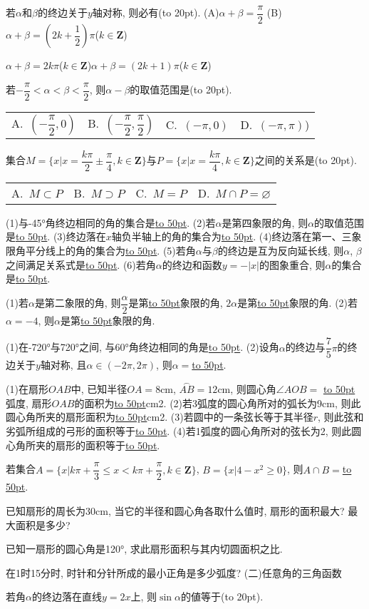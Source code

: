\documentclass[10pt,a4paper]{article}
\newcommand{\blank}[1]{\underline{\hbox to #1pt{}}}
\newcommand{\bracket}[1]{(\hbox to #1pt{})}
\newcommand{\fourch}[4]{\par\begin{tabular}{p{.23\textwidth}p{.23\textwidth}p{.23\textwidth}p{.23\textwidth}}
A.~#1 &B.~#2& C.~#3& D.~#4
\end{tabular}}
\begin{document}
\begin{enumerate}[1.]
{\item 若$\alpha$和$\beta$的终边关于$y$轴对称, 则必有\bracket{20}.
(A)$\alpha +\beta =\dfrac{\pi }2$						(B)$\alpha +\beta =(2k+\dfrac 12)\pi$($k\in \mathbf{Z}$)}{$\alpha +\beta =2k\pi$($k\in \mathbf{Z}$)}{$\alpha +\beta =(2k+1)\pi$($k\in \mathbf{Z}$)}
\item 若$-\dfrac{\pi }2<\alpha <\beta <\dfrac{\pi }2$, 则$\alpha -\beta$的取值范围是\bracket{20}.
\fourch{$(-\dfrac{\pi }2,0)$}{$(-\dfrac{\pi }2,\dfrac{\pi }2)$}{$(-\pi ,0)$}{$(-\pi ,\pi)$)}
\item 集合$M=\{x|x=\dfrac{k\pi }2\pm \dfrac{\pi }4,k\in \mathbf{Z}\}$与$P=\{x|x=\dfrac{k\pi }4,k\in \mathbf{Z}\}$之间的关系是\bracket{20}.
\fourch{$M\subset P$}{$M\supset P$}{$M=P$}{$M\cap P=\varnothing$}
\item (1)与-45°角终边相同的角的集合是\blank{50}.
(2)若$\alpha$是第四象限的角, 则$\alpha$的取值范围是\blank{50}.
(3)终边落在$x$轴负半轴上的角的集合为\blank{50}.
(4)终边落在第一、三象限角平分线上的角的集合为\blank{50}.
(5)若角$\alpha$与$\beta$的终边是互为反向延长线, 则$\alpha$, $\beta$之间满足关系式是\blank{50}.
(6)若角$\alpha$的终边和函数$y=-|x|$的图象重合, 则$\alpha$的集合是\blank{50}.
\item (1)若$\alpha$是第二象限的角, 则$\dfrac{\alpha }2$是第\blank{50}象限的角, $2\alpha$是第\blank{50}象限的角.
(2)若$\alpha =-4$, 则$\alpha$是第\blank{50}象限的角.
\item (1)在-720°与720°之间, 与60°角终边相同的角是\blank{50}.
(2)设角$\alpha$的终边与$\dfrac 75\pi$的终边关于$y$轴对称, 且$\alpha \in (-2\pi ,2\pi)$, 则$\alpha =$\blank{50}.
\item (1)在扇形$OAB$中, 已知半径$OA=8$cm, $\overset\frown{AB}=12$cm, 则圆心角$\angle AOB=$		\blank{50}弧度, 扇形$OAB$的面积为\blank{50}cm2.
(2)若3弧度的圆心角所对的弧长为9cm, 则此圆心角所夹的扇形面积为\blank{50}cm2.
(3)若圆中的一条弦长等于其半径$r$, 则此弦和劣弧所组成的弓形的面积等于\blank{50}.
(4)若1弧度的圆心角所对的弦长为2, 则此圆心角所夹的扇形的面积等于\blank{50}.
\item 若集合$A=\{x|k\pi +\dfrac{\pi }3\le x<k\pi +\dfrac{\pi }2,k\in \mathbf{Z}\}$, $B=\{x|4-x^2\ge 0\}$, 则$A\cap B=$\blank{50}.
\item 已知扇形的周长为30cm, 当它的半径和圆心角各取什么值时, 扇形的面积最大? 最大面积是多少?
\item 已知一扇形的圆心角是120°, 求此扇形面积与其内切圆面枳之比.
\item 在1时15分时, 时针和分针所成的最小正角是多少弧度?
(二)任意角的三角函数
\item 若角$\alpha$的终边落在直线$y=2x$上, 则$\sin \alpha$的値等于\bracket{20}.

\end{enumerate}
\end{document}
